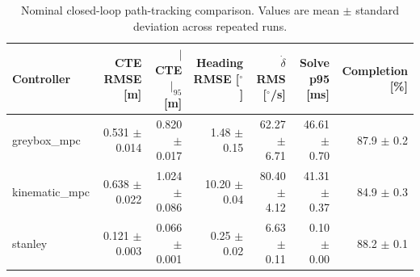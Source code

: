 \begin{table}[t]
\centering
\caption{Nominal closed-loop path-tracking comparison. Values are mean $\pm$ standard deviation across repeated runs.}
\label{tab:controller-comparison}
\begin{tabular}{lrrrrrr}
\hline
Controller & CTE RMSE [m] & $|$CTE$|_{95}$ [m] & Heading RMSE [$^\circ$] & $\dot{\delta}$ RMS [$^\circ$/s] & Solve p95 [ms] & Completion [\%] \\
\hline
greybox\_mpc & 0.531 $\pm$ 0.014 & 0.820 $\pm$ 0.017 & 1.48 $\pm$ 0.15 & 62.27 $\pm$ 6.71 & 46.61 $\pm$ 0.70 & 87.9 $\pm$ 0.2 \\
kinematic\_mpc & 0.638 $\pm$ 0.022 & 1.024 $\pm$ 0.086 & 10.20 $\pm$ 0.04 & 80.40 $\pm$ 4.12 & 41.31 $\pm$ 0.37 & 84.9 $\pm$ 0.3 \\
stanley & 0.121 $\pm$ 0.003 & 0.066 $\pm$ 0.001 & 0.25 $\pm$ 0.02 & 6.63 $\pm$ 0.11 & 0.10 $\pm$ 0.00 & 88.2 $\pm$ 0.1 \\
\hline
\end{tabular}
\end{table}
